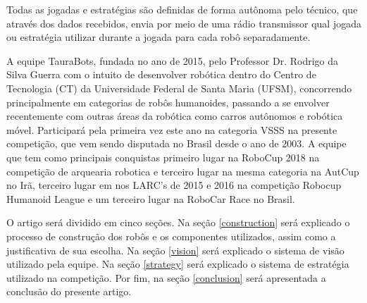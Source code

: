 Todas as jogadas e estratégias são definidas de forma autônoma pelo técnico, que através dos dados recebidos, envia por meio de uma rádio transmissor qual jogada ou estratégia utilizar durante a jogada para cada robô separadamente.

A equipe TauraBots, fundada no ano de 2015, pelo Professor Dr. Rodrigo da Silva Guerra com o intuito de desenvolver robótica dentro do Centro de Tecnologia (CT) da Universidade Federal de Santa Maria (UFSM), concorrendo principalmente em categorias de robôs humanoides, passando a se envolver recentemente com outras áreas da robótica como carros autônomos e robótica móvel. Participará pela primeira vez este ano na categoria VSSS na presente competição, que vem sendo disputada no Brasil desde o ano de 2003. A equipe que tem como principais conquistas primeiro lugar na RoboCup 2018 na competição de arquearia robotica e terceiro lugar na mesma categoria na AutCup no Irã, terceiro lugar em nos LARC's de 2015 e 2016 na competição Robocup Humanoid League e um terceiro lugar na RoboCar Race no Brasil.

O artigo será dividido em cinco seções. Na seção \ref{construction} será explicado o processo de construção dos robôs e os componentes utilizados, assim como a justificativa de sua escolha.
Na seção \ref{vision} será explicado o sistema de visão utilizado pela equipe. Na seção \ref{strategy} será explicado o sistema de estratégia utilizado na competição. 
Por fim, na seção \ref{conclusion} será apresentada a conclusão do presente artigo.